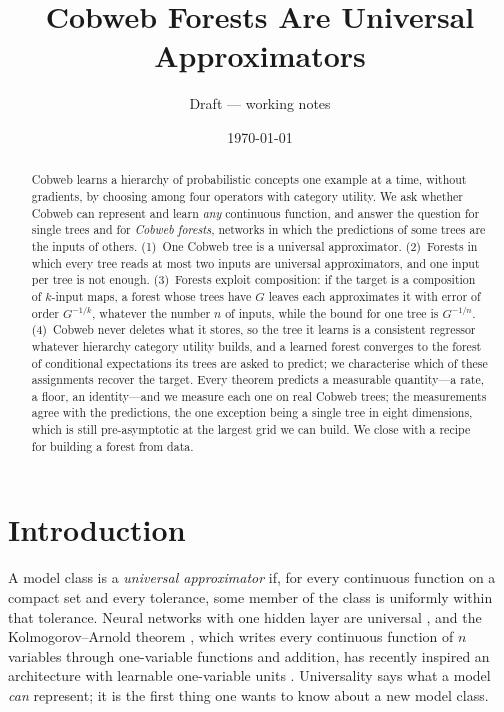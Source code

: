 \documentclass[11pt]{article}
\title{Cobweb Forests Are Universal Approximators}
\author{Draft --- working notes}
\date{\today}
\theoremstyle{definition}
\theoremstyle{remark}
\begin{document}
\maketitle

\begin{abstract}
Cobweb learns a hierarchy of probabilistic concepts one example at a time, without
gradients, by choosing among four operators with category utility.  We ask whether
Cobweb can represent and learn \emph{any} continuous function, and answer the question
for single trees and for \emph{Cobweb forests}, networks in which the predictions of some
trees are the inputs of others.  (1)~One Cobweb tree is a universal approximator.
(2)~Forests in which every tree reads at most two inputs are universal approximators, and
one input per tree is not enough.  (3)~Forests exploit composition: if the target is a
composition of $k$-input maps, a forest whose trees have $G$ leaves each approximates it
with error of order $G^{-1/k}$, whatever the number $n$ of inputs, while the bound for one
tree is $G^{-1/n}$.  (4)~Cobweb never deletes what it stores, so the tree it learns is a
consistent regressor whatever hierarchy category utility builds, and a learned forest
converges to the forest of conditional expectations its trees are asked to predict; we
characterise which of these assignments recover the target.  Every theorem predicts a
measurable quantity---a rate, a floor, an identity---and we measure each one on real
Cobweb trees; the measurements agree with the predictions, the one exception being a
single tree in eight dimensions, which is still pre-asymptotic at the largest grid we can
build.  We close with a recipe for
building a forest from data.
\end{abstract}

\tableofcontents

\section{Introduction}\label{sec:intro}

A model class is a \emph{universal approximator} if, for every continuous function on a
compact set and every tolerance, some member of the class is uniformly within that
tolerance.  Neural networks with one hidden layer are universal \citep{cybenko1989,hornik1989},
and the Kolmogorov--Arnold theorem \citep{kolmogorov1957,arnold1957}, which writes every
continuous function of $n$ variables through one-variable functions and addition, has
recently inspired an architecture with learnable one-variable units
\citep{liu2024kan}.  Universality says what a model \emph{can} represent; it is the first
thing one wants to know about a new model class.
\end{document}
